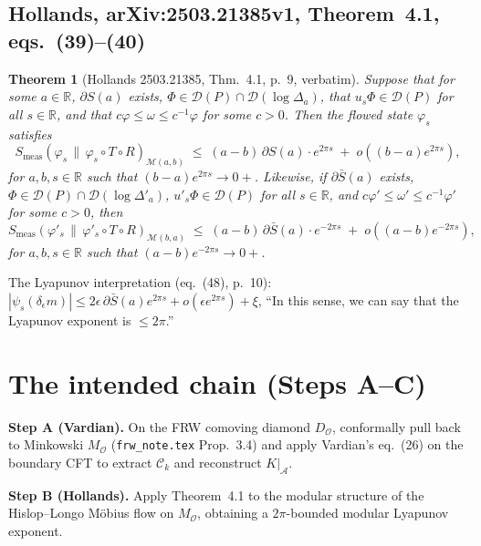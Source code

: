 \documentclass[11pt]{article}
\newtheorem{theorem}{Theorem}
\theoremstyle{remark}
\newcommand{\Ck}{\mathcal{C}_{k}}
\newcommand{\AA}{\mathcal{A}}
\newcommand{\OO}{\mathcal{O}}
\newcommand{\R}{\mathbb{R}}
\newcommand{\Smeas}{S_{\mathrm{meas}}}
\begin{document}
\subsection{Hollands, arXiv:2503.21385v1, Theorem~4.1, eqs.~(39)--(40)}

\begin{theorem}[Hollands 2503.21385, Thm.~4.1, p.~9, verbatim]
Suppose that for some $a \in \R$, $\partial S(a)$ exists,
$\Phi \in \mathcal{D}(P) \cap \mathcal{D}(\log \Delta_a)$, that
$u_s \Phi \in \mathcal{D}(P)$ for all $s \in \R$, and that
$c \varphi \le \omega \le c^{-1} \varphi$ for some $c > 0$. Then the flowed
state $\varphi_s$ satisfies
\begin{equation}
\Smeas(\varphi_s \,\|\, \varphi_s \circ T \circ R)_{\mathcal{M}(a,b)}
\;\le\; (a-b)\, \partial S(a) \cdot e^{2\pi s}
\;+\; o\!\left( (b-a) e^{2\pi s} \right),
\end{equation}
for $a, b, s \in \R$ such that $(b-a) e^{2\pi s} \to 0+$. Likewise, if
$\partial \bar S(a)$ exists, $\Phi \in \mathcal{D}(P) \cap \mathcal{D}(\log
\Delta'_a)$, $u'_s \Phi \in \mathcal{D}(P)$ for all $s \in \R$, and
$c \varphi' \le \omega' \le c^{-1} \varphi'$ for some $c > 0$, then
\begin{equation}
\Smeas(\varphi'_s \,\|\, \varphi'_s \circ T \circ R)_{\mathcal{M}(b,a)}
\;\le\; (a-b)\, \partial \bar S(a) \cdot e^{-2\pi s}
\;+\; o\!\left( (a-b) e^{-2\pi s} \right),
\end{equation}
for $a, b, s \in \R$ such that $(a-b) e^{-2\pi s} \to 0+$.
\end{theorem}

The Lyapunov interpretation (eq.~(48), p.~10):
$|\psi_s(\delta_\epsilon m)| \le 2 \epsilon\, \partial \bar S(a) e^{2\pi s}
+ o(\epsilon e^{2\pi s}) + \xi$, ``In this sense, we can say that the
Lyapunov exponent is $\le 2\pi$.''

\section{The intended chain (Steps A--C)}

\textbf{Step A (Vardian).} On the FRW comoving diamond $D_\OO$, conformally
pull back to Minkowski $M_\OO$ (\texttt{frw\_note.tex} Prop.~3.4) and apply
Vardian's eq.~(26) on the boundary CFT to extract $\Ck$ and reconstruct
$K|_{\AA}$.

\textbf{Step B (Hollands).} Apply Theorem~4.1 to the modular structure of the
Hislop--Longo Möbius flow on $M_\OO$, obtaining a $2\pi$-bounded modular
Lyapunov exponent.
\end{document}
